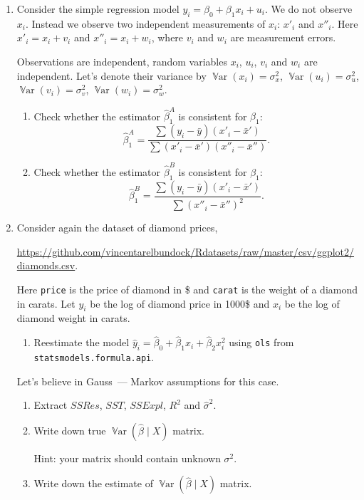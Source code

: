 \documentclass[12pt]{article}
\DeclareMathOperator{\Var}{\mathbb{V}ar}
\newcommand{\hy}{\hat y}
\newcommand{\hb}{\hat\beta}
\begin{document}
\begin{enumerate}
    \item Consider the simple regression model $y_i = \beta_0 + \beta_1 x_i + u_i$.
    We do not observe $x_i$. Instead we observe two independent measurements of $x_i$: $x'_i$ and $x''_i$.
    Here $x'_i = x_i + v_i$ and $x''_i = x_i + w_i$, where $v_i$ and $w_i$ are measurement errors.

    Observations are independent, random variables $x_i$, $u_i$, $v_i$ and $w_i$ are independent. 
    Let's denote their variance by $\Var(x_i) = \sigma^2_x$, $\Var(u_i) = \sigma^2_u$, $\Var(v_i) = \sigma^2_v$, $\Var(w_i) = \sigma^2_w$.

    \begin{enumerate}
        \item Check whether the estimator $\hb_1^A$ is consistent for $\beta_1$:
        \[
        \hb_1^A = \frac{\sum (y_i - \bar y)(x'_i - \bar x')}{\sum (x'_i - \bar x')(x''_i - \bar x'')}.
        \]        
        \item Check whether the estimator $\hb_1^B$ is consistent for $\beta_1$:
        \[
            \hb_1^B = \frac{\sum (y_i - \bar y)(x'_i - \bar x')}{\sum (x''_i - \bar x'')^2}.
        \]
    \end{enumerate}
    
    \item Consider again the dataset of diamond prices,

    \url{https://github.com/vincentarelbundock/Rdatasets/raw/master/csv/ggplot2/diamonds.csv}.
    
    Here \verb|price| is the price of diamond in \$ and \verb|carat| is the weight of a diamond in carats.
    Let $y_i$ be the log of diamond price in 1000\$ and $x_i$ be the log of diamond weight in carats. 
    
   \begin{enumerate}
    \item Reestimate the model $\hy_i = \hb_0 + \hb_1 x_i + \hb_2 x_i^2$ using \verb|ols| from \verb|statsmodels.formula.api|.
   \end{enumerate}
   Let's believe in Gauss~— Markov assumptions for this case. 
   \begin{enumerate}[resume]
    \item Extract $SSRes$, $SST$, $SSExpl$,  $R^2$ and $\hat\sigma^2$.
    \item Write down true $\Var(\hat\beta \mid X)$ matrix. 
    
    Hint: your matrix should contain unknown $\sigma^2$. 
    \item Write down the estimate of $\Var(\hat\beta \mid X)$ matrix. 
    

\end{enumerate}
\end{enumerate}
\end{document}
